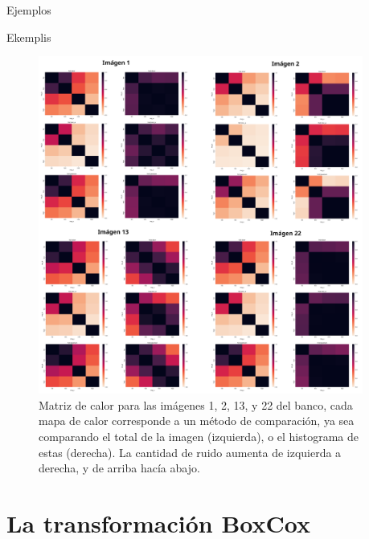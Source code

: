 \documentclass{beamer}
\begin{document}
\begin{frame}{Ejemplos}
    \begin{block}{Ekemplis}
        \begin{figure}[H]
            \centering
            \includegraphics[width=0.95\textwidth]{heatmap_all.png}
            \caption{Matriz de calor para las im\'agenes 1, 2, 13, y 22 del banco, cada mapa de calor corresponde a un m\'etodo de comparaci\'on, ya sea comparando el total de la imagen (izquierda), o el histograma de estas (derecha). La cantidad de ruido aumenta de izquierda a derecha, y de arriba hacía abajo.}
            \label{fig:heatmapall}
        \end{figure}
    \end{block}
\end{frame}


\section{La transformación BoxCox}
\end{document}

